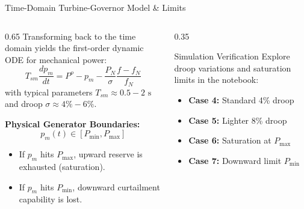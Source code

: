 \begin{frame}{Time-Domain Turbine-Governor Model \& Limits}
\begin{columns}[T]
\begin{column}{0.65\textwidth}
    \footnotesize
    Transforming back to the time domain yields the first-order dynamic ODE for mechanical power:
    \begin{equation*}
        T_{sm} \frac{d p_m}{dt} = P^o - p_m - \frac{P_N}{\sigma} \frac{f - f_N}{f_N}
    \end{equation*}
    with typical parameters $T_{sm} \approx 0.5 - 2\text{ s}$ and droop $\sigma \approx 4\% - 6\%$.
    \vspace{0.15cm}
    
    \textbf{Physical Generator Boundaries:}
    \begin{equation*}
        p_m(t) \in [P_{\min}, P_{\max}]
    \end{equation*}
    \begin{itemize}\setlength{\itemsep}{2pt}
        \item If $p_m$ hits $P_{\max}$, upward reserve is exhausted (saturation).
        \item If $p_m$ hits $P_{\min}$, downward curtailment capability is lost.
    \end{itemize}
\end{column}
\begin{column}{0.35\textwidth}
    \begin{block}{Simulation Verification}
    \scriptsize
    Explore droop variations and saturation limits in the notebook:
    \vspace{0.2cm}
    
    \href{https://github.com/bcornelusse/ELEC0447-analysis-power-systems/blob/master/Lectures/frequency_control/frequency_control_simulation.ipynb}{}
    \vspace{0.15cm}
    
    \tiny
    \begin{itemize}\setlength{\itemsep}{1pt}
        \item \textbf{Case 4:} Standard 4\% droop
        \item \textbf{Case 5:} Lighter 8\% droop
        \item \textbf{Case 6:} Saturation at $P_{\max}$
        \item \textbf{Case 7:} Downward limit $P_{\min}$
    \end{itemize}
    \end{block}
\end{column}
\end{columns}
\end{frame}

